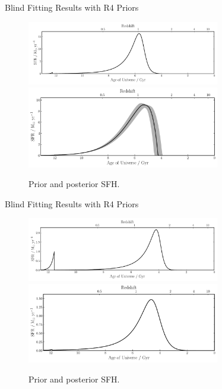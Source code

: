 \documentclass{beamer}
\begin{document}
\begin{frame}{Blind Fitting Results with R4 Priors}
  \begin{figure}
    \centering
    \includegraphics[width=0.75\textwidth]{../pipes/plots/r0_priors/phil_model_5_sfh}
    \includegraphics[width=0.75\textwidth]{../pipes/plots/r4_delayed_burst/phil_model_5_sfh}
    \caption{Prior and posterior SFH.}
  \end{figure}
\end{frame}

\begin{frame}{Blind Fitting Results with R4 Priors}
  \begin{figure}
    \centering
    \includegraphics[width=0.75\textwidth]{../pipes/plots/r0_priors/phil_model_4_sfh}
    \includegraphics[width=0.75\textwidth]{../pipes/plots/r4_dblplaw_burst/phil_model_4_sfh}
    \caption{Prior and posterior SFH.}
  \end{figure}
\end{frame}
\end{document}
